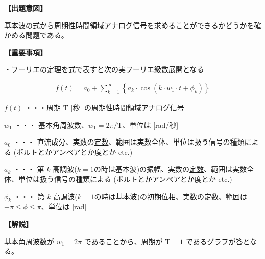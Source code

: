 \noindent \textbf{【出題意図】}

\noindent 基本波の式から周期性時間領域アナログ信号を求めることができるかどうかを確かめる問題である。

\vspace{1em}
\noindent \textbf{【重要事項】}

\medskip
\noindent ・フーリエの定理を式で表すと次の実フーリエ級数展開となる

\begin{align*}
f(t) = a_0 + \sum_{k=1}^{\infty}
\left \{
a_k \cdot \cos (k \cdot w_1 \cdot t + \phi_k)
\right \}
\end{align*}

\medskip
\noindent $f(t)$ ・・・周期 $\textrm{T}$ [秒] の周期性時間領域アナログ信号

\medskip
\noindent $w_1$ ・・・ 基本角周波数、$w_1 = 2\pi/\textrm{T}$、単位は [rad/秒]

\medskip
\noindent $a_0$ ・・・ 直流成分、実数の\underline{定数}、範囲は実数全体、単位は扱う信号の種類による (ボルトとかアンペアとか度とか etc.)

\medskip
\noindent $a_k$ ・・・ 第 $k$ 高調波($k=1$の時は基本波)の振幅、実数の\underline{定数}、範囲は実数全体、単位は扱う信号の種類による (ボルトとかアンペアとか度とか etc.)

\medskip
\noindent $\phi_k$ ・・・ 第 $k$ 高調波($k=1$の時は基本波)の初期位相、実数の\underline{定数}、範囲は $-\pi \leq \phi \leq \pi$、単位は [rad]


\vspace{1em}
\noindent \textbf{【解説】}

\noindent 基本角周波数が $w_1 = 2\pi$ であることから、周期が $\textrm{T} = 1$ であるグラフが答となる。

